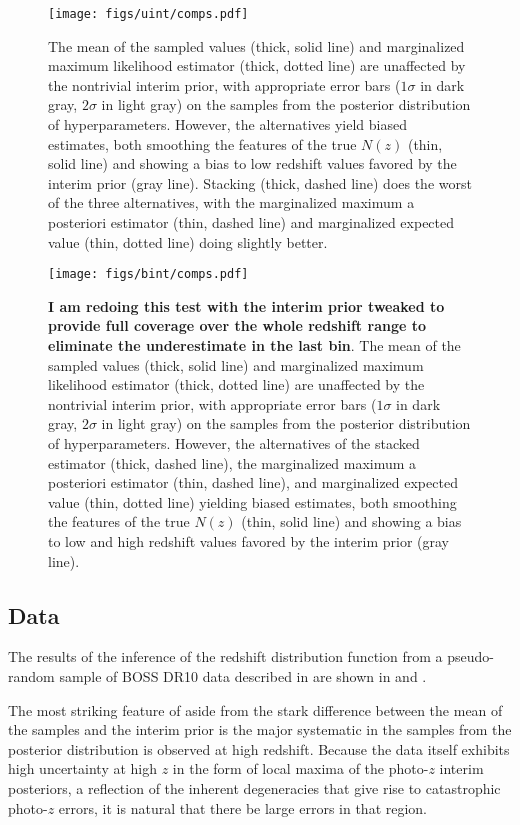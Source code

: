 \begin{figure}
	\texttt{[image: figs/uint/comps.pdf]}
	\caption{The mean of the sampled values (thick, solid line) and marginalized maximum likelihood estimator (thick, dotted line) are unaffected by the nontrivial interim prior, with appropriate error bars ($1\sigma$ in dark gray, $2\sigma$ in light gray) on the samples from the posterior distribution of hyperparameters.  
		However, the alternatives yield biased estimates, both smoothing the features of the true $N(z)$ (thin, solid line) and showing a bias to low redshift values favored by the interim prior (gray line).  
		Stacking (thick, dashed line) does the worst of the three alternatives, with the marginalized maximum a posteriori estimator (thin, dashed line) and marginalized expected value (thin, dotted line) doing slightly better.}
\end{figure}

\begin{figure}
	\texttt{[image: figs/bint/comps.pdf]}
	\caption{\textbf{I am redoing this test with the interim prior tweaked to provide full coverage over the whole redshift range to eliminate the 
			underestimate in the last bin}.  
			The mean of the sampled values (thick, solid line) and marginalized maximum likelihood estimator (thick, dotted line) are unaffected by the nontrivial interim prior, with appropriate error bars ($1\sigma$ in dark gray, $2\sigma$ in light gray) on the samples from the posterior distribution of hyperparameters.  
			However, the alternatives of the stacked estimator (thick, dashed line), the marginalized maximum a posteriori estimator (thin, dashed line), and marginalized expected value (thin, dotted line) yielding biased estimates, both smoothing the features of the true $N(z)$ (thin, solid line) and showing a bias to low and high redshift values favored by the interim prior (gray line).}
\end{figure}

\subsection{Data}

The results of the inference of the redshift distribution function from a pseudo-random sample of BOSS DR10 data described in  are shown in  and .  

The most striking feature of  aside from the stark difference between the mean of the samples and the interim prior is the major systematic in the samples from the posterior distribution is observed at high redshift.  
Because the data itself exhibits high uncertainty at high $z$ in the form of local maxima of the photo-$z$ interim posteriors, a reflection of the inherent degeneracies that give rise to catastrophic photo-$z$ errors, it is natural that there be large errors in that region.  

